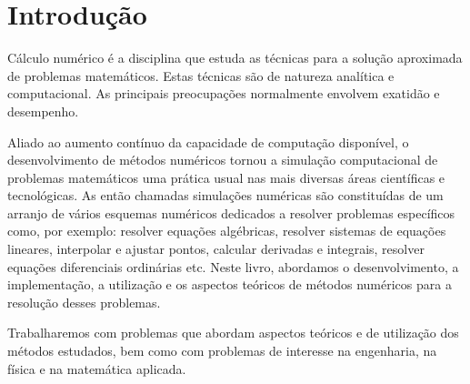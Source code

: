 
%

\chapter{Introdução}

Cálculo numérico é a disciplina que estuda as técnicas para a solução aproximada de problemas matemáticos. Estas técnicas são de natureza analítica e computacional. As principais preocupações normalmente envolvem exatidão e desempenho.

Aliado ao aumento contínuo da capacidade de computação disponível, o desenvolvimento de métodos numéricos tornou a simulação computacional de problemas matemáticos uma prática usual nas mais diversas áreas científicas e tecnológicas. As então chamadas simulações numéricas são constituídas de um arranjo de vários esquemas numéricos dedicados a resolver problemas específicos como, por exemplo: resolver equações algébricas, resolver sistemas de equações lineares, interpolar e ajustar pontos, calcular derivadas e integrais, resolver equações diferenciais ordinárias etc. Neste livro, abordamos o desenvolvimento, a implementação, a utilização e os aspectos teóricos de métodos numéricos para a resolução desses problemas.

Trabalharemos com problemas que abordam aspectos teóricos e de utilização dos métodos estudados, bem como com problemas de interesse na engenharia, na física e na matemática aplicada.

